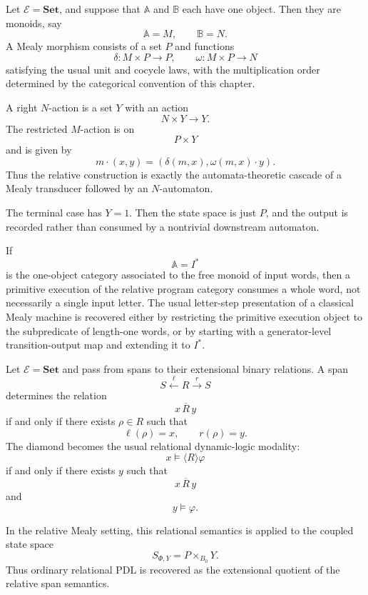 \begin{example}
\label{ex:classical-mealy-cascades}
Let \(\mathcal E=\mathbf{Set}\), and suppose that \(\mathbb A\) and
\(\mathbb B\) each have one object. Then they are monoids, say
\[
\mathbb A=M,
\qquad
\mathbb B=N.
\]
A Mealy morphism consists of a set \(P\) and functions
\[
\delta:M\times P\to P,
\qquad
\omega:M\times P\to N
\]
satisfying the usual unit and cocycle laws, with the multiplication order
determined by the categorical convention of this chapter.

A right \(N\)-action is a set \(Y\) with an action
\[
N\times Y\to Y.
\]
The restricted \(M\)-action is on
\[
P\times Y
\]
and is given by
\[
m\cdot(x,y)
=
\left(
\delta(m,x),
\omega(m,x)\cdot y
\right).
\]
Thus the relative construction is exactly the automata-theoretic cascade of a
Mealy transducer followed by an \(N\)-automaton.

The terminal case has \(Y=1\). Then the state space is just \(P\), and the
output is recorded rather than consumed by a nontrivial downstream automaton.
\end{example}

\begin{example}
\label{ex:words-versus-letter-steps-relative}
If
\[
\mathbb A=I^\ast
\]
is the one-object category associated to the free monoid of input words, then
a primitive execution of the relative program category consumes a whole word,
not necessarily a single input letter. The usual letter-step presentation of a
classical Mealy machine is recovered either by restricting the primitive
execution object to the subpredicate of length-one words, or by starting with a
generator-level transition-output map and extending it to \(I^\ast\).
\end{example}

\begin{example}
\label{ex:relative-relational-pdl}
Let \(\mathcal E=\mathbf{Set}\) and pass from spans to their extensional
binary relations. A span
\[
S\xleftarrow{\ell}R\xrightarrow{r}S
\]
determines the relation
\[
x\,\overline R\,y
\]
if and only if there exists \(\rho\in R\) such that
\[
\ell(\rho)=x,
\qquad
r(\rho)=y.
\]
The diamond becomes the usual relational dynamic-logic modality:
\[
x\models\langle R\rangle\varphi
\]
if and only if there exists \(y\) such that
\[
x\,\overline R\,y
\]
and
\[
y\models\varphi.
\]

In the relative Mealy setting, this relational semantics is applied to the
coupled state space
\[
S_{\Phi,Y}=P\times_{B_0}Y.
\]
Thus ordinary relational PDL is recovered as the extensional quotient of the
relative span semantics.
\end{example}

